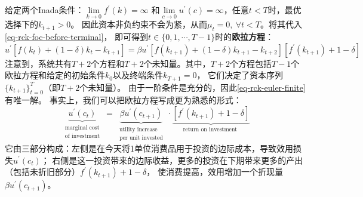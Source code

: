给定两个Inada条件：$\lim\limits_{k\rightarrow 0}f^{\prime}(k) = \infty$
和$\lim\limits_{c\rightarrow 0}u^{\prime}(c) = \infty$，任意$t<T$时，最优选择下的$k_{t+1}>0$。
因此资本非负约束不会为紧，从而$\mu_t=0,~\forall t< T$。将其代入\cref{eq-rck-foc-before-terminal}，
即可得到$t\in\{0,1,\cdots,T-1\}$时的\textbf{欧拉方程}：
\begin{equation}    \label{eq-rck-euler-finite}
    u^{\prime}\left[f\left(k_t\right)+(1-\delta) k_t-k_{t+1}\right]
        = \beta u^{\prime}\left[f\left(k_{t+1}\right)+(1-\delta) k_{t+1}-k_{t+2}\right]
            \left[f^{\prime}\left(k_{t+1}\right)+1-\delta\right]
\end{equation}
注意到，系统共有$T+2$个方程和$T+2$个未知量。其中，$T+2$个方程包括$T-1$个欧拉方程和给定的初始条件$k_0$以及终端条件$k_{T+1}=0$，
它们决定了资本序列$\{k_{t+1}\}_{t=0}^T$（即$T+2$个未知量）。
由于一阶条件是充分的，因此\cref{eq-rck-euler-finite}有唯一解。
事实上，我们可以把欧拉方程写成更为熟悉的形式：
\begin{equation*}
    \underbrace{u^{\prime}\left(c_t\right)}_
    {\begin{array}{c}
        \text { marginal cost } \\
        \text { of investment }
    \end{array}}
    =\underbrace{\beta u^{\prime}\left(c_{t+1}\right)}_
    {\begin{array}{c}
        \text { utility increase } \\
        \text { per unit invested }
    \end{array}} 
    \cdot \underbrace{\left[f^{\prime}\left(k_{t+1}\right)+1-\delta\right]}_{\text {return on investment }}
\end{equation*}
它由三部分构成：左侧是在今天将1单位消费品用于投资的边际成本，导致效用损失$u^{\prime}(c_t)$；
右侧是这一投资带来的边际收益，更多的投资在下期带来更多的产出（包括未折旧部分）$f^{\prime}(k_{t+1})+1-\delta$，
使消费提高，效用增加一个折现量$\beta u^{\prime}(c_{t+1})$。

